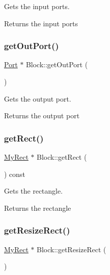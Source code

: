 Gets the input ports.

\begin{DoxyReturn}{Returns}
the input ports 
\end{DoxyReturn}
\mbox{\label{classBlock_a897dd6edfbdec3930d764aa39f0d3de8}} 
\subsubsection{\texorpdfstring{get\+Out\+Port()}{getOutPort()}}
{\footnotesize\ttfamily \hyperlink{classPort}{Port} $\ast$ Block\+::get\+Out\+Port (\begin{DoxyParamCaption}{ }\end{DoxyParamCaption})}

Gets the output port.

\begin{DoxyReturn}{Returns}
the output port 
\end{DoxyReturn}
\mbox{\label{classBlock_a396f46a4f7592ffdf4d168be2e79ee52}} 
\subsubsection{\texorpdfstring{get\+Rect()}{getRect()}}
{\footnotesize\ttfamily \hyperlink{classMyRect}{My\+Rect} $\ast$ Block\+::get\+Rect (\begin{DoxyParamCaption}{ }\end{DoxyParamCaption}) const}

Gets the rectangle.

\begin{DoxyReturn}{Returns}
the rectangle 
\end{DoxyReturn}
\mbox{\label{classBlock_ad4c55f893fad7eec6e2ecaa9e6bec6da}} 
\subsubsection{\texorpdfstring{get\+Resize\+Rect()}{getResizeRect()}}
{\footnotesize\ttfamily \hyperlink{classMyRect}{My\+Rect} $\ast$ Block\+::get\+Resize\+Rect (\begin{DoxyParamCaption}{ }\end{DoxyParamCaption})}

